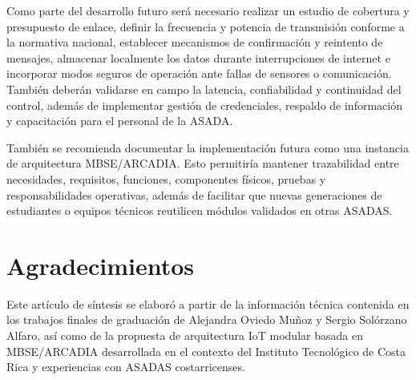 \documentclass[12pt,letterpaper]{article}
\begin{document}
Como parte del desarrollo futuro será necesario realizar un estudio de cobertura y presupuesto de enlace, definir la frecuencia y potencia de transmisión conforme a la normativa nacional, establecer mecanismos de confirmación y reintento de mensajes, almacenar localmente los datos durante interrupciones de internet e incorporar modos seguros de operación ante fallas de sensores o comunicación. También deberán validarse en campo la latencia, confiabilidad y continuidad del control, además de implementar gestión de credenciales, respaldo de información y capacitación para el personal de la ASADA.

También se recomienda documentar la implementación futura como una instancia de arquitectura MBSE/ARCADIA. Esto permitiría mantener trazabilidad entre necesidades, requisitos, funciones, componentes físicos, pruebas y responsabilidades operativas, además de facilitar que nuevas generaciones de estudiantes o equipos técnicos reutilicen módulos validados en otras ASADAS.

\section{Agradecimientos}
Este artículo de síntesis se elaboró a partir de la información técnica contenida en los trabajos finales de graduación de Alejandra Oviedo Muñoz y Sergio Solórzano Alfaro, así como de la propuesta de arquitectura IoT modular basada en MBSE/ARCADIA desarrollada en el contexto del Instituto Tecnológico de Costa Rica y experiencias con ASADAS costarricenses.
\end{document}

